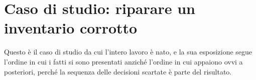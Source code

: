 
\chapter{Caso di studio: riparare un inventario corrotto}
\label{cap:smeraldo}

Questo è il caso di studio da cui l'intero lavoro è nato, e la sua esposizione segue l'ordine in cui i fatti si sono presentati anziché l'ordine in cui appaiono ovvi a posteriori, perché la sequenza delle decisioni scartate è parte del risultato.

